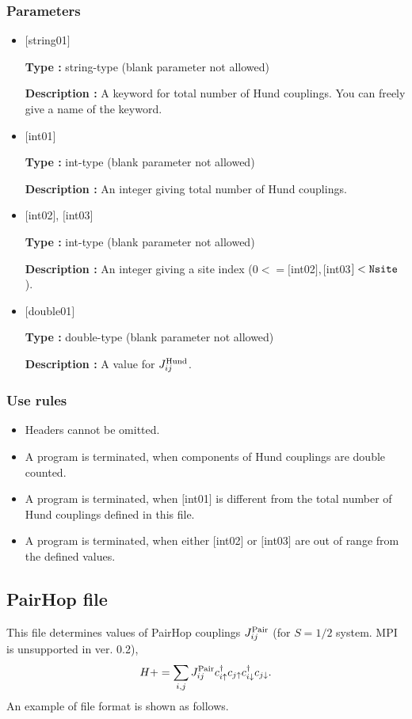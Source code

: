 \subsubsection{Parameters}
 \begin{itemize}

   \item  $[$string01$]$
   
    {\bf Type :} string-type (blank parameter not allowed)

   {\bf Description :}  A keyword for total number of Hund couplings. You can freely give a name of the keyword.

   \item  $[$int01$]$
   
    {\bf Type :} int-type (blank parameter not allowed)

   {\bf Description :} An integer giving total number of Hund couplings.

  \item  $[$int02$]$, $[$int03$]$
  
 {\bf Type :} int-type (blank parameter not allowed)

{\bf Description :} An integer giving a site index ($0<= [$int02$], [$int03$]<\verb|Nsite|$).
 
 \item  $[$double01$]$
   
   {\bf Type :} double-type (blank parameter not allowed)

  {\bf Description :}  A value for $J_{ij}^{\rm Hund}$.
  
\end{itemize}

\subsubsection{Use rules}
\begin{itemize}
\item Headers cannot be omitted. 
\item A program is terminated, when components of Hund couplings are double counted.
\item A program is terminated, when $[$int01$]$ is different from the total number of Hund couplings defined in this file.
\item A program is terminated, when either $[$int02$]$ or $[$int03$]$ are out of range from the defined values.
\end{itemize}

\newpage
\subsection{PairHop file}
This file determines values of PairHop couplings $J_{ij}^{\rm Pair}$ {(for $S=1/2$ system. MPI is unsupported in ver. 0.2)},
\begin{equation}
H+=\sum_{i,j}J_{ij}^{\rm Pair} c_ {i \uparrow}^{\dag}c_{j\uparrow}c_{i \downarrow}^{\dag}c_{j  \downarrow}.
\end{equation}
An example of file format is shown as follows.

